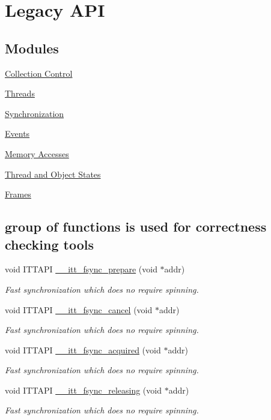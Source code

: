 \hypertarget{group__legacy}{}\section{Legacy A\+P\+I}
\label{group__legacy}
\subsection*{Modules}
\begin{DoxyCompactItemize}
\item 
\hyperlink{group__legacy__control}{Collection Control}
\item 
\hyperlink{group__legacy__threads}{Threads}
\item 
\hyperlink{group__legacy__sync}{Synchronization}
\item 
\hyperlink{group__legacy__events}{Events}
\item 
\hyperlink{group__legacy__memory}{Memory Accesses}
\item 
\hyperlink{group__legacy__state}{Thread and Object States}
\item 
\hyperlink{group__frames}{Frames}
\end{DoxyCompactItemize}
\subsection*{group of functions is used for correctness checking tools}
\begin{DoxyCompactItemize}
\item 
void I\+T\+T\+A\+P\+I \hyperlink{group__legacy_ga529918590edeef71ffbe8c6692b7019c}{\+\_\+\+\_\+itt\+\_\+fsync\+\_\+prepare} (void $\ast$addr)
\begin{DoxyCompactList}\small\item\em Fast synchronization which does no require spinning. \end{DoxyCompactList}\item 
void I\+T\+T\+A\+P\+I \hyperlink{group__legacy_ga196fcb16865c3f9a316148fa620f7e13}{\+\_\+\+\_\+itt\+\_\+fsync\+\_\+cancel} (void $\ast$addr)
\begin{DoxyCompactList}\small\item\em Fast synchronization which does no require spinning. \end{DoxyCompactList}\item 
void I\+T\+T\+A\+P\+I \hyperlink{group__legacy_ga538018fcdc9be04929e3fdcaf444e3be}{\+\_\+\+\_\+itt\+\_\+fsync\+\_\+acquired} (void $\ast$addr)
\begin{DoxyCompactList}\small\item\em Fast synchronization which does no require spinning. \end{DoxyCompactList}\item 
void I\+T\+T\+A\+P\+I \hyperlink{group__legacy_ga67e0e05bdecc21673acecf207372b307}{\+\_\+\+\_\+itt\+\_\+fsync\+\_\+releasing} (void $\ast$addr)
\begin{DoxyCompactList}\small\item\em Fast synchronization which does no require spinning. \end{DoxyCompactList}\end{DoxyCompactItemize}


